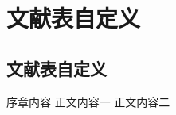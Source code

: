 \documentclass[twoside]{report}
\begin{document}
\chapter{文献表自定义}
\begin{refsection}
\section{文献表自定义}

序章内容\cite{GPS1988--,杨洪升2013-56-75,马克思2013-302-302}
正文内容一\cite{Andersen1995-42-49,BUSECK1980-117-211,Calkin2011-8-9}
正文内容二\cite{Parsons2000b--,Parsons2000--,Parsons2000noloc--,Parsons2000nodate--}
\cite{1977-49-49,亚洲地质图编目组1978-194-208,陈晋镳1980-56-114}

\printbibliography[heading=subbibintoc,title=【参考文献】]
\end{refsection}
\end{document}
